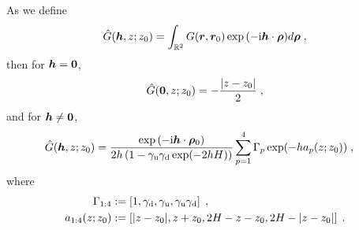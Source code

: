 \begin{thm}\label{Proposition...GreensFunction}
    As we define
    \begin{equation}
        \Hat{G}(\boldsymbol{h}, z; z_0) = \int_{\mathbb{R}^2} G(\boldsymbol{r}, \boldsymbol{r}_0) \exp{(-\mathrm{i} \boldsymbol{h} \cdot \boldsymbol{\rho})} d \bm{\rho}\;,
    \end{equation}     
then for $\boldsymbol{h}=\bm{0}$,   
\begin{equation}\label{eq...hat_G_solution...Zeroth}
        \hat{G}(\bm{0}, z; z_0) = -\frac{\lvert z-z_0\rvert}{2}\;,
\end{equation}        
and for $\boldsymbol{h}\neq \bm{0}$,     
    \begin{equation}\label{eq...hat_G_solution...Non-zero}
    \begin{aligned}
\hat{G}(\V{h}, z; z_0) &=  \frac{ \exp{(-\mathrm{i} \V{h} \cdot \V{\rho}_0)}}{2 h  \left(1-\gamma_{\mrm{u}}\gamma_{\mrm{d}}\exp(-2 h H)\right)} \sum_{p=1}^4\Gamma_p\exp(- h a_p(z;z_0))\;, %
    \end{aligned}     
    \end{equation}         
where 
\begin{align*}
 \Gamma_{1:4}&:=\left[1,\gamma_{\mathrm{d}},\gamma_{\mathrm{u}},\gamma_{\mathrm{u}}\gamma_{\mathrm{d}}\right]\;,\\
 a_{1:4}(z;z_0)&:=\left[\lvert z-z_0\rvert, z+z_0,2H-z-z_0,2H-\lvert z-z_0\rvert\right]\;.
\end{align*}
\end{thm}
